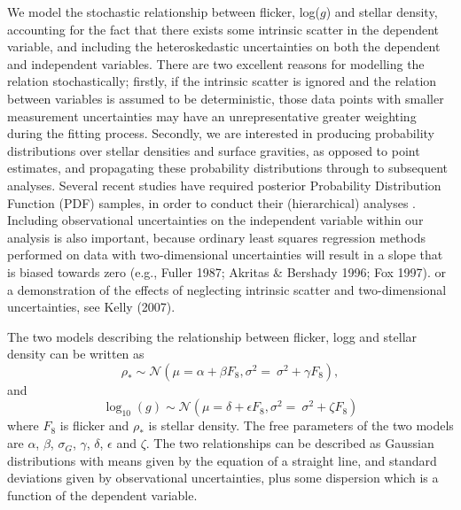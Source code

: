 We model the stochastic relationship between flicker, log($g$) and stellar
density, accounting for the fact that there exists some intrinsic scatter in
the dependent variable, and including the heteroskedastic uncertainties on both
the dependent and independent variables.
There are two excellent reasons for modelling the relation stochastically;
firstly, if the intrinsic scatter is ignored and the relation between
variables is assumed to be deterministic, those data points with smaller
measurement uncertainties may have an unrepresentative greater weighting
during the fitting process.
Secondly, we are interested in producing probability distributions over stellar
densities and surface gravities, as opposed to point estimates, and propagating
these probability distributions through to subsequent analyses.
Several recent studies have required posterior Probability Distribution
Function (PDF) samples, in order to conduct their (hierarchical)
analyses \citep[e.g.][]{rogers:2014, foreman-Mackey:2014, angus:2015}.
Including observational uncertainties on the independent variable within our
analysis is also important, because ordinary least squares regression methods
performed on data with two-dimensional uncertainties will result in a slope
that is biased towards zero
(e.g., Fuller 1987; Akritas \& Bershady 1996; Fox 1997).
or a demonstration of the effects of neglecting intrinsic scatter and
two-dimensional uncertainties, see Kelly (2007).

The two models describing the relationship between flicker, logg and stellar
density can be written as
\begin{equation}
	\rho_* \sim \mathcal{N}(\mu = \alpha + \beta F_8, \sigma^2 = \
	\sigma^2 + \gamma F_8),
\end{equation}
\label{eq:rho}
and
\begin{equation}
	\log_{10}(g) \sim \mathcal{N}(\mu = \delta + \epsilon F_8, \sigma^2 = \
	\sigma^2 + \zeta F_8)
\end{equation}
\label{eq:logg}
where $F_8$ is flicker and $\rho_*$ is stellar density.
The free parameters of the two models are $\alpha$, $\beta$, $\sigma_G$,
$\gamma$, $\delta$, $\epsilon$ and $\zeta$.
The two relationships can be described as Gaussian distributions with means
given by the equation of a straight line, and standard deviations given by
observational uncertainties, plus some dispersion which is a function of the
dependent variable.


